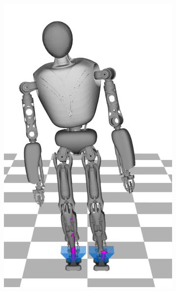 \begin{figure}
\begin{subfigure}{.16\textwidth}
	\includegraphics[width=1\linewidth]{fig/walkStatic/snaps/8}
	\caption{}
\end{subfigure}%
\begin{subfigure}{.16\textwidth}

\end{subfigure}
\end{figure}
